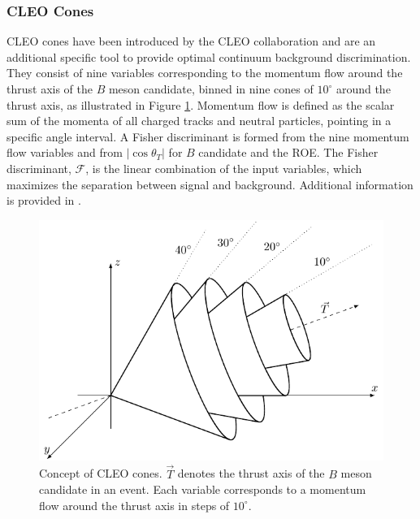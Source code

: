 \subsubsection{CLEO Cones}
CLEO cones have been introduced by the CLEO collaboration and are an additional specific tool to provide optimal continuum background discrimination. They consist of nine variables corresponding to the momentum flow around the thrust axis of the $B$ meson candidate, binned in nine cones of $10^\circ$ around the thrust axis, as illustrated in Figure \ref{fig:ccones}. Momentum flow is defined as the scalar sum of the momenta of all charged tracks and neutral particles, pointing in a specific angle interval. A Fisher discriminant is formed from the nine momentum flow variables and from $\vert \cos\theta_T\vert$ for $B$ candidate and the ROE. The Fisher discriminant, $\mathcal{F}$, is the linear combination of the input variables, which maximizes the separation between signal and background. Additional information is provided in \cite{asner1996search}.

\begin{figure}[H]
	\centering
	\captionsetup{width=0.8\linewidth}
	\includegraphics[scale=1]{texfig/CCones}
	\caption{Concept of CLEO cones. $\vec{T}$ denotes the thrust axis of the $B$ meson candidate in an event. Each variable corresponds to a momentum flow around the thrust axis in steps of $10^\circ$.}
	\label{fig:ccones}
\end{figure}

